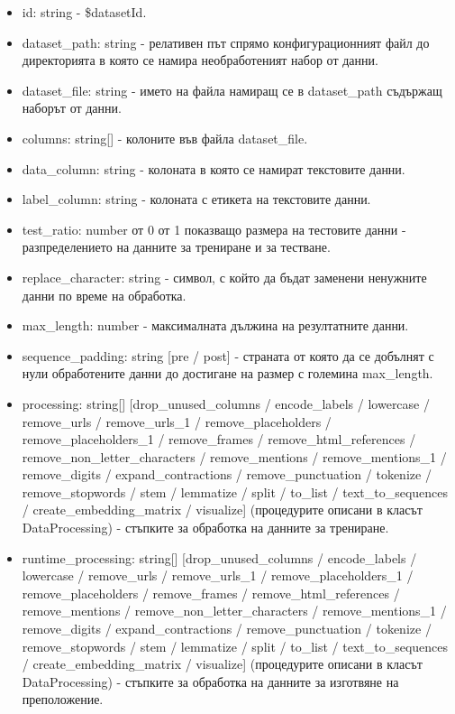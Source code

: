 \documentclass{article}
\begin{document}
\begin{itemize}
\begin{itemize}
\begin{itemize}
      \item id: string - \$datasetId.
      \item dataset\_path: string - релативен път спрямо конфигурационният файл до директорията в която се намира
      необработеният набор от данни.
      \item dataset\_file: string - името на файла намиращ се в dataset\_path съдържащ наборът от данни.
      \item columns: string[] - колоните във файла dataset\_file.
      \item data\_column: string - колоната в която се намират текстовите данни.
      \item label\_column: string - колоната с етикета на текстовите данни.
      \item test\_ratio: number от 0 от 1 показващо размера на тестовите данни - разпределението на данните за
      трениране и за тестване.
      \item replace\_character: string - символ, с който да бъдат заменени ненужните данни по време на обработка.
      \item max\_length: number - максималната дължина на резултатните данни.
      \item sequence\_padding: string [pre / post] - страната от която да се добълнят с нули обработените данни до
      достигане на размер с големина max\_length.
      \item processing: string[] [drop\_unused\_columns / encode\_labels / lowercase / remove\_urls /
      remove\_urls\_1 / remove\_placeholders / remove\_placeholders\_1 / remove\_frames / remove\_html\_references /
      remove\_non\_letter\_characters / remove\_mentions / remove\_mentions\_1 / remove\_digits /
      expand\_contractions / remove\_punctuation / tokenize / remove\_stopwords / stem / lemmatize / split /
      to\_list / text\_to\_sequences / create\_embedding\_matrix / visualize] (процедурите описани в класът
      DataProcessing) - стъпките за обработка на данните за трениране.
      \item runtime\_processing: string[] [drop\_unused\_columns / encode\_labels / lowercase / remove\_urls /
      remove\_urls\_1 / remove\_placeholders\_1 / remove\_placeholders / remove\_frames / remove\_html\_references /
      remove\_mentions / remove\_non\_letter\_characters / remove\_mentions\_1 / remove\_digits /
      expand\_contractions / remove\_punctuation / tokenize / remove\_stopwords / stem / lemmatize / split /
      to\_list / text\_to\_sequences / create\_embedding\_matrix / visualize] (процедурите описани в класът 
      DataProcessing) - стъпките за обработка на данните за изготвяне на преположение.


\end{itemize}
\end{itemize}
\end{itemize}
\end{document}
